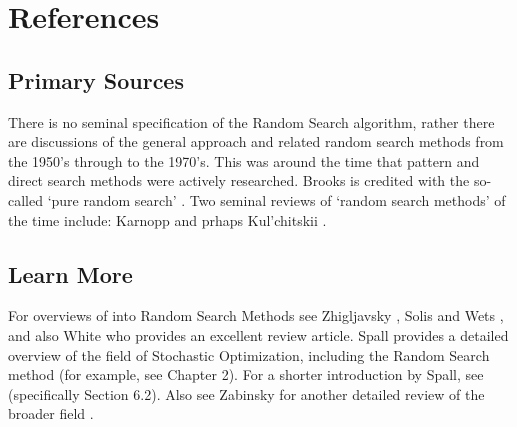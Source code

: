 \documentclass[a4paper, 11pt]{article}
\begin{document}


\section{References}
\label{sec:references}

% 
% 
\subsection{Primary Sources}
There is no seminal specification of the Random Search algorithm, rather there are discussions of the general approach and related random search methods from the 1950's through to the 1970's. This was around the time that pattern and direct search methods were actively researched.
Brooks is credited with the so-called `pure random search' \cite{Brooks1958}. Two seminal reviews of `random search methods' of the time include: Karnopp \cite{Karnopp1963} and prhaps Kul'chitskii \cite{Kul'chitskii1976}.


% 
% 
\subsection{Learn More}
For overviews of into Random Search Methods see Zhigljavsky \cite{Zhigljavsky1991}, Solis and Wets \cite{Solis1981}, and also White \cite{White1971} who provides an excellent review article.
Spall provides a detailed overview of the field of Stochastic Optimization, including the Random Search method \cite{Spall2003} (for example, see Chapter 2). For a shorter introduction by Spall, see \cite{Spall2004} (specifically Section 6.2). Also see Zabinsky for another detailed review of the broader field \cite{Zabinsky2003}.
\end{document}
